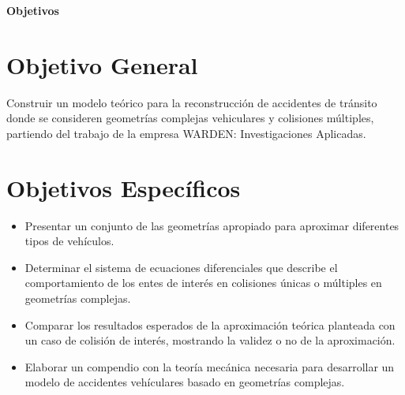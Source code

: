 \setcounter{section}{0}
\begin{singlespace}%

\huge{\textbf{Objetivos}} 

\normalsize

\section{Objetivo General}
\hspace{1 cm} Construir un modelo teórico para la reconstrucción de accidentes de tránsito donde se consideren geometrías complejas vehiculares y colisiones múltiples, partiendo del trabajo de la empresa WARDEN: Investigaciones Aplicadas.

\section{Objetivos Específicos}
\normalsize

\begin{itemize}
    \item Presentar un conjunto de las geometrías apropiado para aproximar diferentes tipos de vehículos.
    
    \item Determinar el sistema de ecuaciones diferenciales que describe el comportamiento de los entes de interés en colisiones únicas o múltiples en geometrías complejas.
    
    \item Comparar los resultados esperados de la aproximación teórica planteada con un caso de colisión de interés, mostrando la validez o no de la aproximación.

     \item Elaborar un compendio con la teoría mecánica necesaria para desarrollar un modelo de accidentes vehículares basado en geometrías complejas.
\end{itemize}

\end{singlespace}